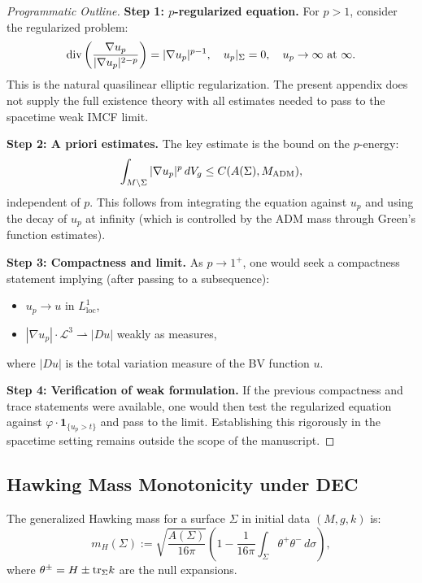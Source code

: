 \begin{proof}[Programmatic Outline]
\textbf{Step 1: $p$-regularized equation.}
For $p > 1$, consider the regularized problem:
\begin{equation}
    \mathrm{div}\left( \frac{\nabla u_p}{|\nabla u_p|^{2-p}} \right) = |\nabla u_p|^{p-1}, \quad u_p|_\Sigma = 0, \quad u_p \to \infty \text{ at } \infty.
\end{equation}
This is the natural quasilinear elliptic regularization. The present appendix does not supply the full existence theory with all estimates needed to pass to the spacetime weak IMCF limit.

\textbf{Step 2: A priori estimates.}
The key estimate is the bound on the $p$-energy:
\begin{equation}
    \int_{M \setminus \Sigma} |\nabla u_p|^p \, dV_g \le C(A(\Sigma), M_{\mathrm{ADM}}),
\end{equation}
independent of $p$. This follows from integrating the equation against $u_p$ and using the decay of $u_p$ at infinity (which is controlled by the ADM mass through Green's function estimates).

\textbf{Step 3: Compactness and limit.}
As $p \to 1^+$, one would seek a compactness statement implying (after passing to a subsequence):
\begin{itemize}
    \item $u_p \to u$ in $L^1_{\mathrm{loc}}$,
    \item $|\nabla u_p| \cdot \mathcal{L}^3 \rightharpoonup |Du|$ weakly as measures,
\end{itemize}
where $|Du|$ is the total variation measure of the BV function $u$.

\textbf{Step 4: Verification of weak formulation.}
If the previous compactness and trace statements were available, one would then test the regularized equation against $\varphi \cdot \mathbf{1}_{\{u_p > t\}}$ and pass to the limit. Establishing this rigorously in the spacetime setting remains outside the scope of the manuscript.
\end{proof}

\subsection{Hawking Mass Monotonicity under DEC}
The generalized Hawking mass for a surface $\Sigma$ in initial data $(M, g, k)$ is:
\begin{equation}
    m_H(\Sigma) := \sqrt{\frac{A(\Sigma)}{16\pi}} \left( 1 - \frac{1}{16\pi} \int_\Sigma \theta^+ \theta^- \, d\sigma \right),
\end{equation}
where $\theta^\pm = H \pm \mathrm{tr}_\Sigma k$ are the null expansions.

